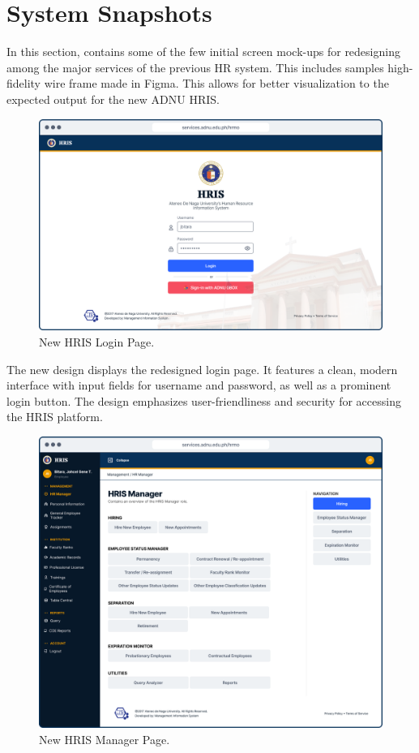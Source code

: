 \section{System Snapshots}

In this section, contains some of the few initial screen mock-ups for redesigning among the major services of the previous HR system. This includes samples high-fidelity wire frame made in Figma. This allows for better visualization to the expected output for the new ADNU HRIS.

    \begin{figure}[H]
        \centering
        \includegraphics[width=1\linewidth]{figures/app/login.png}
        \caption{New HRIS Login Page.}
        \label{fig:enter-label}
    \end{figure}

    The new design displays the redesigned login page. It features a clean, modern interface with input fields for username and password, as well as a prominent login button. The design emphasizes user-friendliness and security for accessing the HRIS platform.

    \begin{figure}[H]
        \centering
        \includegraphics[width=1\linewidth]{figures/app/manager.png}
        \caption{New HRIS Manager Page.}
        \label{fig:enter-label}
    \end{figure}


